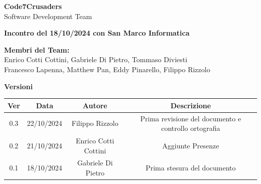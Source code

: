 \documentclass{article}
\begin{document}
\begin{titlepage}
    {\Huge \textbf{Code7Crusaders}}\\
    \vspace{0.5cm}
    {\Large Software Development Team}\\
    \vspace{2cm}
    

    {\large \textbf{Incontro del 18/10/2024 con San Marco Informatica}}\\
    \vspace{5cm}

    \textbf{Membri del Team:}\\
    Enrico Cotti Cottini, Gabriele Di Pietro, Tommaso Diviesti \\
    Francesco Lapenna, Matthew Pan, Eddy Pinarello, Filippo Rizzolo \\
    \vspace{0.5cm}
    
    \vspace{1cm}
\end{titlepage}

\begin{center}
    \textbf{Versioni}
    \\
    \begin{tabular}{|c|c|c|c|}
        \hline
        \textbf{Ver} & \textbf{Data} & \textbf{Autore} & \textbf{Descrizione}\\
        \hline
        0.3 & 22/10/2024 & Filippo Rizzolo & Prima revisione del documento e controllo ortografia \\ 
        \hline
	    0.2 & 21/10/2024 & Enrico Cotti Cottini & Aggiunte Presenze \\
	    \hline
        0.1 & 18/10/2024 & Gabriele Di Pietro & Prima stesura del documento \\
        \hline
    \end{tabular}
\end{center}

\newpage
\tableofcontents
\newpage

\end{document}
